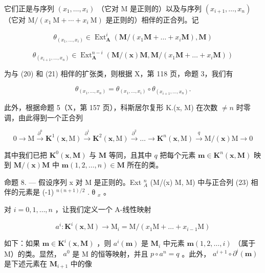 它们正是与序列 \((x_{1}, \ldots, x_{i})\) （它对 M 是正则的）以及与序列 \((x_{i+1}, \ldots, x_{n})\) （它对 \(\mathrm{M}/(x_{1} \mathrm{~M} + \cdots + x_{i} \mathrm{~M})\) 是正则的）相伴的正合列。记

\[
\theta_ {(x _ {1}, \dots , x _ {i})} \in \operatorname{Ext} _ {\mathbf {A}} ^ {i} (\mathbf {M} / (x _ {1} \mathbf {M} + \dots + x _ {i} \mathbf {M}), \mathbf {M})
\]

\[
\theta_ {(x _ {i + 1}, \dots , x _ {n})} \in \operatorname{Ext} _ {\mathbf {A}} ^ {n - i} (\mathbf {M} / (\boldsymbol {x}) \mathbf {M}, \mathbf {M} / (x _ {1} \mathbf {M} + \dots + x _ {i} \mathbf {M}))
\]

为与 (20) 和 (21) 相伴的扩张类，则根据 X，第 118 页，命题 3，我们有

\[
\theta_ {(x _ {1}, \dots , x _ {n})} = \theta_ {(x _ {1}, \dots , x _ {i})} \circ \theta_ {(x _ {i + 1}, \dots , x _ {n})}.\tag{22}
\]

此外，根据命题 5（X，第 157 页），科斯居尔复形 K.(x, M) 在次数 \(\neq n\) 时零调，由此得到一个正合列

\[
0 \longrightarrow \mathrm{M} \xrightarrow {\partial^ {0}} \mathbf {K} ^ {1} (\boldsymbol {x}, \mathrm{M}) \xrightarrow {\partial^ {1}} \mathbf {K} ^ {2} (\boldsymbol {x}, \mathrm{M}) \xrightarrow {\partial^ {2}} \dots \longrightarrow \mathbf {K} ^ {n} (\boldsymbol {x}, \mathrm{M}) \xrightarrow {q} \mathrm{M} / (\boldsymbol {x}) \mathrm{M} \longrightarrow 0\tag{23}
\]

其中我们已把 \(\mathbf{K}^{0}(\boldsymbol{x},\mathbf{M})\) 与 \(\mathbf{M}\) 等同，且其中 \(q\) 把每个元素 \(\boldsymbol{m}\in\mathbf{K}^{n}(\boldsymbol{x},\mathbf{M})\) 映到 \(\mathbf{M}/(\boldsymbol{x})\mathbf{M}\) 中 \(\boldsymbol{m}(1,2,\ldots,n)\in\mathbf{M}\) 所在的类。

命题 8. --- 假设序列 x 对 M 是正则的。Ext \(_{A}^{n}\) (M/(x) M, M) 中与正合列 (23) 相伴的元素是 (-1) \(^{n(n+1)/2}\) . θ \(_{x}\) 。

对 \(i = 0,1,\dots,n\) ，让我们定义一个 A-线性映射

\[
a ^ {i}: \mathbf {K} ^ {i} (\boldsymbol {x}, \mathrm{M}) \rightarrow \mathrm{M} _ {i} = \mathrm{M} / (x _ {1} \mathrm{M} + \dots + x _ {i - 1} \mathrm{M})
\]

如下：如果 \(\boldsymbol{m} \in \mathbf{K}^i(\boldsymbol{x}, \mathbf{M})\) ，则 \(a^i(\boldsymbol{m})\) 是 \(\mathbf{M}_i\) 中元素 \(\boldsymbol{m}(1, 2, \ldots, i)\) （属于 M）的类。显然， \(a^0\) 是 M 的恒等映射，并且 \(p \circ a^n = q\) 。此外， \(a^{i+1} \circ \partial^i(\boldsymbol{m})\) 是下述元素在 \(\mathbf{M}_{i+1}\) 中的像

